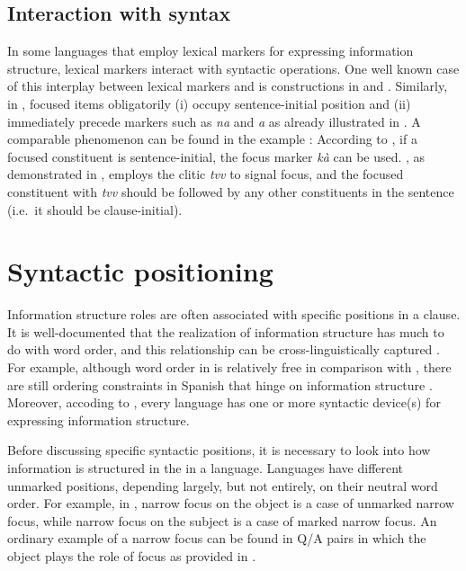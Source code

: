 \subsection{Interaction with syntax}
\label{4:ssec:interaction-syn}



In some languages that employ lexical markers for expressing
information structure, lexical markers interact
with syntactic operations.  One well known case of this interplay
between lexical markers and  is
 constructions in  and 
\citep{choi:99,ishihara:01}. Similarly, in , focused items
obligatorily (i) occupy sentence-initial position and (ii) immediately
precede  markers such as \textit{na} and \textit{a} as already
illustrated in  \citep[4]{drubig:03}.  A comparable
phenomenon can be found in the  example :
According to \citet{fery:krifka:08}, if a focused constituent is
sentence-initial, the focus marker \textit{k\`{a}} can be
used. , as demonstrated in , employs the
clitic \textit{tvv} to signal focus, and the focused constituent with
\textit{tvv} should be followed by any other constituents in the
sentence (i.e.\ it should be clause-initial).



\section{Syntactic positioning}
\label{4:sec:syntactic}



Information structure roles are often associated with specific
positions in a clause. It is well-documented that the realization of
information structure has much to do with word order, and this
relationship can be cross-linguistically 
captured \citep{zubizarreta:98,van:05,mereu:09}.  For example, although word
order in  is relatively free in comparison with
, there are still ordering constraints in Spanish that
hinge on information structure \citep{zagona:02}.  Moreover, accoding
to \citet{li:thompson:76}, every language has one or more syntactic
device(s) for expressing information structure.



Before discussing specific syntactic positions, it is necessary to
look into how information is structured in the 
in a language. Languages have different
unmarked  positions, depending largely, but not entirely, on
their neutral word order. For example, in , narrow focus on the
object is a case of unmarked narrow focus, while narrow focus on the
subject is a case of marked narrow focus.  An ordinary example of a
narrow focus can be found in Q/A pairs in which the object plays the
role of focus as provided in .


